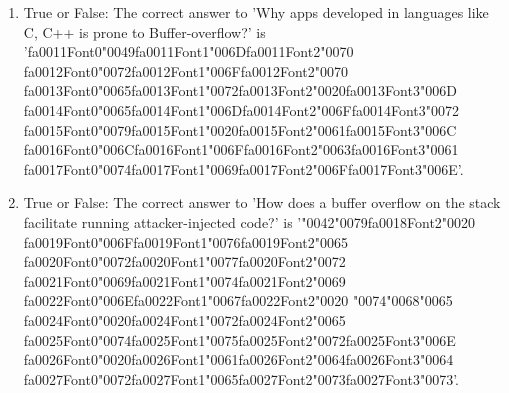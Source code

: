 \documentclass[12pt]{article}
\begin{document}
\begin{enumerate}[label=\arabic*.]
\item True or False: The correct answer to 'Why apps developed in languages like C, C++ is prone to Buffer-overflow?' is '{\csname fa0011Font0\endcsname\char"0049}{\csname fa0011Font1\endcsname\char"006D}{\csname fa0011Font2\endcsname\char"0070} {\csname fa0012Font0\endcsname\char"0072}{\csname fa0012Font1\endcsname\char"006F}{\csname fa0012Font2\endcsname\char"0070} {\csname fa0013Font0\endcsname\char"0065}{\csname fa0013Font1\endcsname\char"0072}{\csname fa0013Font2\endcsname\char"0020}{\csname fa0013Font3\endcsname\char"006D} {\csname fa0014Font0\endcsname\char"0065}{\csname fa0014Font1\endcsname\char"006D}{\csname fa0014Font2\endcsname\char"006F}{\csname fa0014Font3\endcsname\char"0072} {\csname fa0015Font0\endcsname\char"0079}{\csname fa0015Font1\endcsname\char"0020}{\csname fa0015Font2\endcsname\char"0061}{\csname fa0015Font3\endcsname\char"006C} {\csname fa0016Font0\endcsname\char"006C}{\csname fa0016Font1\endcsname\char"006F}{\csname fa0016Font2\endcsname\char"0063}{\csname fa0016Font3\endcsname\char"0061} {\csname fa0017Font0\endcsname\char"0074}{\csname fa0017Font1\endcsname\char"0069}{\csname fa0017Font2\endcsname\char"006F}{\csname fa0017Font3\endcsname\char"006E}'.
\item True or False: The correct answer to 'How does a buffer overflow on the stack facilitate running attacker-injected code?' is '{\char"0042}{\char"0079}{\csname fa0018Font2\endcsname\char"0020} {\csname fa0019Font0\endcsname\char"006F}{\csname fa0019Font1\endcsname\char"0076}{\csname fa0019Font2\endcsname\char"0065} {\csname fa0020Font0\endcsname\char"0072}{\csname fa0020Font1\endcsname\char"0077}{\csname fa0020Font2\endcsname\char"0072} {\csname fa0021Font0\endcsname\char"0069}{\csname fa0021Font1\endcsname\char"0074}{\csname fa0021Font2\endcsname\char"0069} {\csname fa0022Font0\endcsname\char"006E}{\csname fa0022Font1\endcsname\char"0067}{\csname fa0022Font2\endcsname\char"0020} {\char"0074}{\char"0068}{\char"0065} {\csname fa0024Font0\endcsname\char"0020}{\csname fa0024Font1\endcsname\char"0072}{\csname fa0024Font2\endcsname\char"0065} {\csname fa0025Font0\endcsname\char"0074}{\csname fa0025Font1\endcsname\char"0075}{\csname fa0025Font2\endcsname\char"0072}{\csname fa0025Font3\endcsname\char"006E} {\csname fa0026Font0\endcsname\char"0020}{\csname fa0026Font1\endcsname\char"0061}{\csname fa0026Font2\endcsname\char"0064}{\csname fa0026Font3\endcsname\char"0064} {\csname fa0027Font0\endcsname\char"0072}{\csname fa0027Font1\endcsname\char"0065}{\csname fa0027Font2\endcsname\char"0073}{\csname fa0027Font3\endcsname\char"0073}'.

\end{enumerate}
\end{document}
